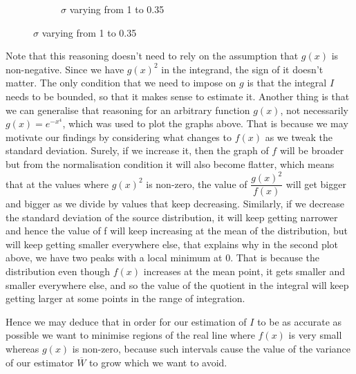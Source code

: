 \documentclass[12pt]{article}
\begin{document}
\begin{figure}[H]
\begin{subfigure}{.5\textwidth}
\caption{$\sigma$ varying from 1 to 0.35}
\label{fig:sub2}
\end{subfigure}
\label{fig:test}
\end{figure}
Note that this reasoning doesn't need to rely on the assumption that $g(x)$ is non-negative. Since we have $ g(x)^2 $ in the integrand, the sign of it doesn't matter. 
The only condition that we need to impose on $g$ is that the integral $I$ needs to be
bounded, so that it makes sense to estimate it. 
Another thing is that we can generalise that reasoning for an arbitrary function $g(x)$,
not necessarily $g(x) = e^{-x^4}$, which was used to plot the graphs above. 
That is because we may motivate our findings by considering what changes to $f(x)$ as we 
tweak the standard deviation. Surely, if we increase it, then the graph of $f$ will be broader but from the normalisation condition it will also become flatter, which means that at the values where $g(x)^2$ is non-zero, the value of $\dfrac{g(x)^2}{f(x)}$ will get bigger and bigger as we divide by values that keep decreasing. 
Similarly, if we decrease the standard deviation of the source distribution, 
it will keep getting narrower and hence the value of f will keep increasing at the mean 
of the distribution, but will keep getting smaller everywhere else, 
that explains why in the second plot above, we have two peaks with a local minimum at 0. 
That is because the distribution even though $f(x)$ increases at the mean point, 
it gets smaller and smaller everywhere else, and so the value of the quotient in the integral will keep getting larger at some points in the range of integration. 

Hence we may deduce that in order for our estimation of $I$ to be as accurate as possible we want to minimise regions of the real line where $f(x)$ is very small whereas $g(x)$ is non-zero, because such intervals cause the value of the variance of our estimator $\overline{W}$ to grow which we want to avoid.
\end{document}
